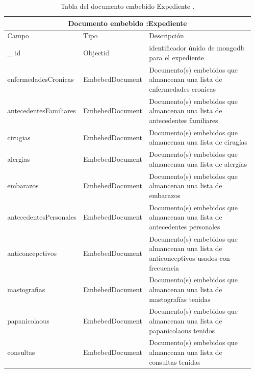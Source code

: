 	 
	 \begin{table}[htb]
	\centering
	\begin{tabular}{| p{3.5cm}| p{3.0cm} | p{9.8cm} |}
	\hline
	\multicolumn{3}{|c|}{Documento embebido :Expediente} \\
	\hline
	Campo & Tipo &  Descripción\\ \hline
	
	\_ id & Objectid &identificador únido de mongodb para el expediente  \\ \hline
	
	enfermedadesCronicas & EmbebedDocument & Documento(s) embebidos que almancenan una lista de enfermedades cronicas \\ \hline
	
	antecedentesFamiliares& EmbebedDocument & Documento(s) embebidos que almancenan una lista de antecedentes familiares\\ \hline
	
	cirugias & EmbebedDocument & Documento(s) embebidos que almancenan una lista de cirugías\\ \hline
	
	alergias & EmbebedDocument & Documento(s) embebidos que almancenan una lista de alergías \\ \hline
	
	embarazos & EmbebedDocument & Documento(s) embebidos que almancenan una lista de embarazos \\ \hline
	
	antecedentesPersonales & EmbebedDocument & Documento(s) embebidos que almancenan una lista de antecedentes personales \\ \hline
	
	anticoncepctivos & EmbebedDocument & Documento(s) embebidos que almancenan una lista de anticonceptivos usados con frecuencia\\ \hline
	
	mastografias & EmbebedDocument & Documento(s) embebidos que almancenan una lista de mastografías tenidas \\ \hline
	
	papanicolaous & EmbebedDocument & Documento(s) embebidos que almancenan una lista de papanicolaous tenidos\\ \hline
	
	consultas & EmbebedDocument & Documento(s) embebidos que almancenan una lista de consultas tenidas\\ \hline
			
	
	\end{tabular}
	\caption{Tabla del documento embebido Expediente .}
	\label{tabla:diccionarioDatos}
	\end{table}	 
	 
